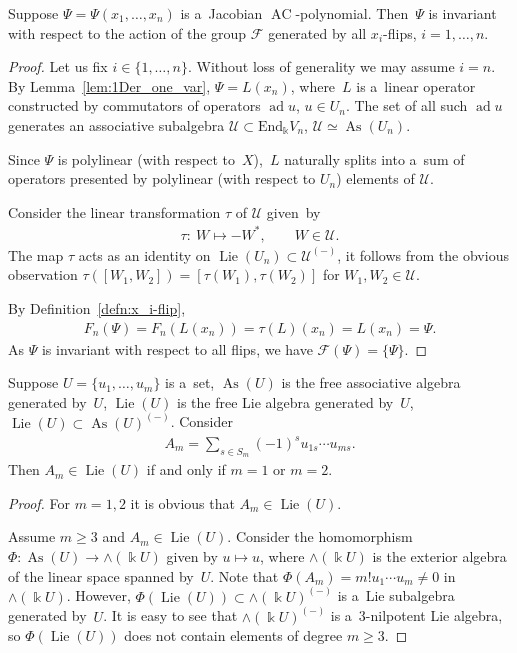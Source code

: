 \documentclass[pdftex]{sigma}
\DeclareMathOperator{\ad}{ad}
\begin{document}
\begin{lemma}
\label{lem:JacobianInvariant}
Suppose $\Psi=\Psi(x_1,\dots, x_n)$ is a~Jacobian $\operatorname{AC}$-polynomial.
Then~$\Psi $ is invariant with respect to the action of the group $\mathcal F$ generated by all $x_i$-flips, $i=1,\dots,
n$.
\end{lemma}

\begin{proof}
Let us f\/ix $i\in \{1,\dots, n\}$.
Without loss of generality we may assume $i=n$.
By Lemma~\ref{lem:1Der_one_var}, $\Psi = L(x_n)$, where~$L$ is a~linear operator constructed by commutators of operators
$\ad u$, $u\in U_n$.
The set of all such $\ad u$ generates an associative subalgebra $\mathcal U\subset \mathrm{End}_\Bbbk V_n$,
$\mathcal U\simeq \operatorname{As}(U_n)$.

Since $\Psi $ is polylinear (with respect to~$X$),~$L$ naturally splits into a~sum of operators presented by polylinear
(with respect to $U_n$) elements of $\mathcal U$.

Consider the linear transformation $\tau $ of $\mathcal U$ given~by
\begin{gather*}
\tau: \ W \mapsto -W^*,
\qquad
W\in \mathcal U.
\end{gather*}
The map $\tau $ acts as an identity on $\operatorname{Lie}(U_n)\subset \mathcal U^{(-)}$, it follows from the obvious observation $\tau
([W_1,W_2])=[\tau(W_1),\tau(W_2)]$ for $W_1,W_2\in \mathcal U$.

By Def\/inition~\ref{defn:x_i-flip},
\begin{gather*}
F_n(\Psi) = F_n(L(x_n)) = \tau(L)(x_n) = L(x_n) = \Psi.
\end{gather*}
As $\Psi $ is invariant with respect to all f\/lips, we have $\mathcal F(\Psi) =\{\Psi \}$.
\end{proof}

\begin{lemma}
\label{lem:AlternatingSum=Lie}
Suppose $U=\{u_1,\dots, u_m\}$ is a~set, $\operatorname{As}(U) $ is the free associative algebra generated by~$U$, $\operatorname{Lie}(U)$ is the free
Lie algebra generated by~$U$, $\operatorname{Lie}(U)\subset \operatorname{As}(U)^{(-)}$.
Consider
\begin{gather*}
A_m = \sum\limits_{s\in S_m}(-1)^s u_{1s}\cdots u_{ms}.
\end{gather*}
Then $A_m \in \operatorname{Lie}(U)$ if and only if $m=1$ or $m=2$.
\end{lemma}

\begin{proof}
For $m=1,2$ it is obvious that $A_m\in \operatorname{Lie}(U)$.

Assume $m\ge 3$ and $A_m\in \operatorname{Lie}(U)$.
Consider the homomorphism $\Phi: \operatorname{As}(U)\to \wedge (\Bbbk U)$ given by $u\mapsto u$, where $\wedge (\Bbbk U)$ is the
exterior algebra of the linear space spanned by~$U$.
Note that $\Phi(A_m) = m! u_1\cdots u_m \ne 0$ in $\wedge(\Bbbk U)$.
However, $\Phi(\operatorname{Lie}(U))\subset \wedge(\Bbbk U)^{(-)}$ is a~Lie subalgebra generated by~$U$.
It is easy to see that $\wedge(\Bbbk U)^{(-)}$ is a~3-nilpotent Lie algebra, so $\Phi(\operatorname{Lie}(U))$ does not contain elements
of degree $m\ge 3$.
\end{proof}
\end{document}
